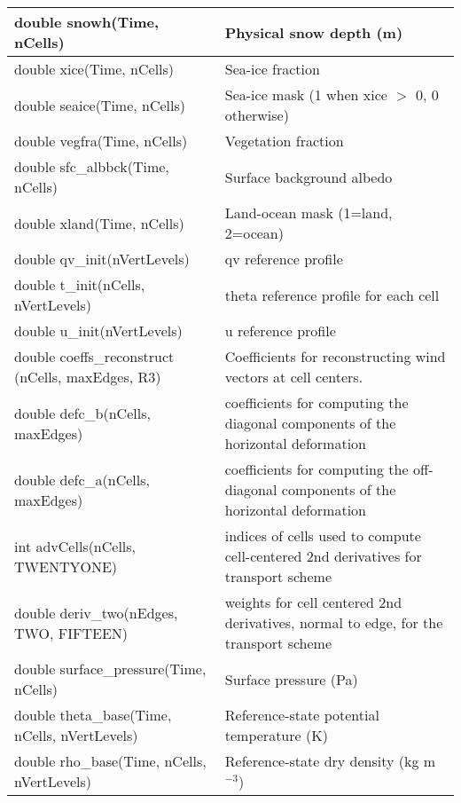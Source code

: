 {\begin{longtable}{|p{2.5in} |p{3.75in}|}
        double snowh(Time, nCells)                  & Physical snow depth (m) \\ \hline
        double xice(Time, nCells)                   & Sea-ice fraction \\ \hline
        double seaice(Time, nCells)                 & Sea-ice mask (1 when xice $>$ 0, 0 otherwise) \\ \hline
        double vegfra(Time, nCells)                 & Vegetation fraction \\ \hline
        double sfc\_albbck(Time, nCells)            &  Surface background albedo \\ \hline
        double xland(Time, nCells)                  & Land-ocean mask (1=land, 2=ocean) \\ \hline
        double qv\_init(nVertLevels)           &               qv reference profile \\ \hline
        double t\_init(nCells, nVertLevels)    &               theta reference profile for each cell \\ \hline
        double u\_init(nVertLevels)            &               u reference profile \\ \hline
        double coeffs\_reconstruct \hfil\break (nCells, maxEdges, R3) &   Coefficients for reconstructing wind vectors at cell centers. \\ \hline
        double defc\_b(nCells, maxEdges)                 & coefficients for computing the diagonal components \hfil\break of the horizontal deformation \\ \hline
        double defc\_a(nCells, maxEdges)                 &  coefficients for computing the off-diagonal components \hfil\break of the horizontal deformation\\ \hline
        int advCells(nCells, TWENTYONE)                  &indices of cells used to compute cell-centered 2nd derivatives for transport scheme \\ \hline
        double \hfil\break deriv\_two(nEdges, TWO, FIFTEEN)          & weights for cell centered 2nd derivatives, normal to edge, for the transport scheme \\ \hline
        double surface\_pressure(Time, nCells)           & Surface pressure (Pa) \\ \hline
        double \hfil\break theta\_base(Time, nCells, nVertLevels)    & Reference-state potential temperature (K) \\ \hline
        double \hfil\break rho\_base(Time, nCells, nVertLevels)      & Reference-state dry density (kg m$^{-3}$) \\ \hline

\end{longtable}}

